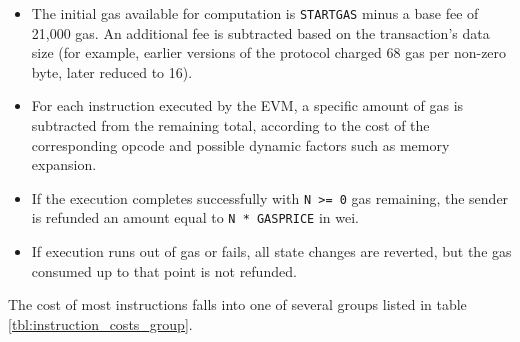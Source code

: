 \documentclass{scrbook}
\begin{document}
\begin{itemize}
    \item The initial gas available for computation is \texttt{STARTGAS} minus a base fee of 21,000 gas. An additional fee is subtracted based on the transaction's data size (for example, earlier versions of the protocol charged 68 gas per non-zero byte, later reduced to 16).
    
    \item For each instruction executed by the EVM, a specific amount of gas is subtracted from the remaining total, according to the cost of the corresponding opcode and possible dynamic factors such as memory expansion.
    
    \item If the execution completes successfully with \texttt{N >= 0} gas remaining, the sender is refunded an amount equal to \texttt{N * GASPRICE} in wei.
    
    \item If execution runs out of gas or fails, all state changes are reverted, but the gas consumed up to that point is not refunded.
\end{itemize}

The cost of most instructions falls into one of several groups listed in table \ref{tbl:instruction_costs_group}.\\
\end{document}

